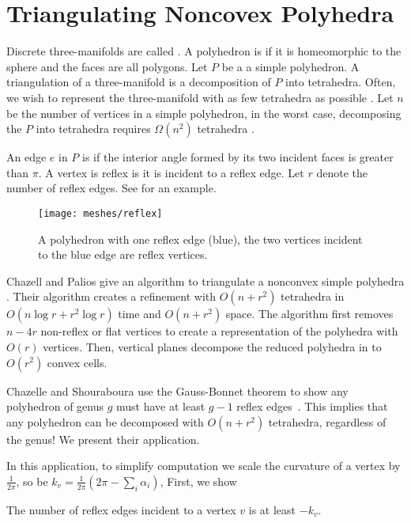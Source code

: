 \section{Triangulating Noncovex Polyhedra}
\label{sec:triangulating}

Discrete three-manifolds are called . 
A polyhedron is  if it is homeomorphic to the sphere 
and the faces are all polygons.
Let $P$ be a a simple polyhedron.
A triangulation of a three-manifold is a decomposition
of $P$ into tetrahedra.
Often, we wish to represent the three-manifold
with as few tetrahedra as possible \cite{simplify-mesh-1999}.
Let $n$ be the number of vertices in a simple polyhedron,
in the worst case, decomposing the $P$
 into tetrahedra requires $\Omega(n^2)$ tetrahedra
\cite{chazelle-lower-1984}.

 An edge $e$ in $P$ is
 if the interior angle formed by its two incident faces
is greater than $\pi$.
A vertex is reflex is it is incident to a reflex edge.
Let $r$ denote the number of reflex edges.
See  for an example.

\begin{figure}[htb]
\centering
\texttt{[image: meshes/reflex]}
\caption{A polyhedron with one reflex edge (blue), the two vertices incident to the blue
edge are reflex vertices.}
\label{fig:reflex}
\end{figure}
Chazell and Palios give an
algorithm to triangulate a nonconvex simple polyhedra \cite{triangulating-polytope-1990}.
 Their algorithm creates a refinement with $O(n+r^2)$ tetrahedra
in $O(n\log r +r^2\log r)$ time and $O(n+r^2)$ space.
The algorithm first removes $n-4r$ non-reflex or flat vertices
to create a representation of the polyhedra with $O(r)$ vertices.
Then, vertical planes decompose the reduced polyhedra in to
$O(r^2)$ convex cells.

Chazelle and Shouraboura use the Gauss-Bonnet theorem to show any polyhedron
 of genus $g$ must have at least $g-1$ reflex edges~\cite{tetra-bounds-c-s-1994}.
 This implies that any polyhedron
can be decomposed with $O(n+r^2)$ tetrahedra, regardless  of 
the genus!  We present their application.

In this application, to simplify computation we scale the curvature of a vertex
by $\frac{1}{2\pi}$, so be $k_v=\frac{1}{2\pi}\left(2\pi-\sum_i \alpha_i\right)$,
First, we show 

\begin{lemma}\label{lem:reflex-edge}
The number of reflex edges  incident to a vertex $v$  is at least $-k_v.$
\end{lemma}

